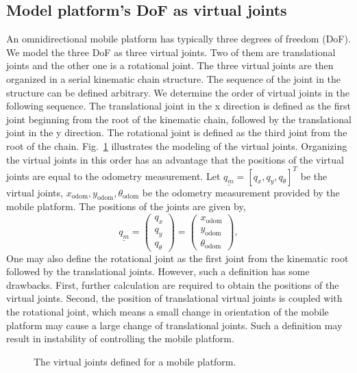 \subsection{Model platform's DoF as virtual joints}
An omnidirectional mobile platform has typically three degrees of freedom (DoF). We model the three DoF as three virtual joints. Two of them are translational joints and the other one is a rotational joint. The three virtual joints are then organized in a serial kinematic chain structure. The sequence of the joint in the structure can be defined arbitrary. We determine the order of virtual joints in the following sequence. The translational joint in the x direction is defined as the first joint beginning from the root of the kinematic chain, followed by the translational joint in the y direction. The rotational joint is defined as the third joint from the root of the chain. Fig.~\ref{fig:vjoints} illustrates the modeling of the virtual joints. Organizing the virtual joints in this order has an advantage that the positions of the virtual joints are equal to the odometry measurement. Let $\underline{q_m} = {[q_x,q_y,q_{\theta}]}^T$ be the virtual joints, $x_{\text{odom}}, y_{\text{odom}},  \theta_{\text{odom}}$ be the odometry measurement provided by the mobile platform. The positions of the joints are given by, 
\begin{equation}
    \underline{q_m} = 
	\begin{pmatrix}
	 q_x \\
	 q_y \\
	 q_{\theta}
	\end{pmatrix} 
	=
	\begin{pmatrix}
	 x_{\text{odom}} \\
	 y_{\text{odom}} \\
	 \theta_{\text{odom}}
	 \end{pmatrix},
\end{equation}
One may also define the rotational joint as the first joint from the kinematic root followed by the translational joints. However, such a definition has some drawbacks. First, further calculation are required to obtain the positions of the virtual joints. Second, the position of translational virtual joints is coupled with the rotational joint, which means a small change in orientation of the mobile platform may cause a large change of translational joints. Such a definition may result in instability of controlling the mobile platform. 

\begin{figure}[!htbp]
\centering
\def\svgwidth{0.5\linewidth}

\captionsetup{justification=raggedright}
\caption{The virtual joints defined for a mobile platform.}
\label{fig:vjoints}       %
\end{figure}	

